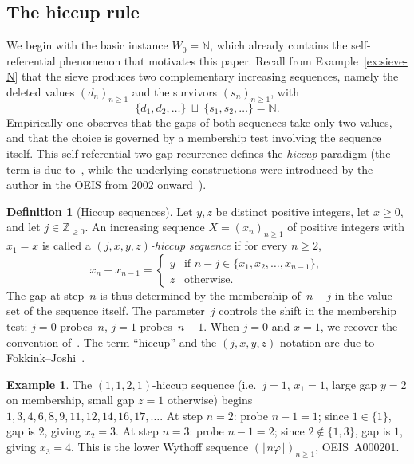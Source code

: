 \documentclass[11pt]{article}
\numberwithin{equation}{section}
\theoremstyle{plain}
\theoremstyle{definition}
\newtheorem{definition}[theorem]{Definition}
\newtheorem{example}[theorem]{Example}
\theoremstyle{remark}
\newcommand{\N}{\mathbb{N}}
\newcommand{\Z}{\mathbb{Z}}
\begin{document}
\subsection{The hiccup rule}\label{sec:hiccup}

We begin with the basic instance $W_0=\N$, which already contains the
self-referential phenomenon that motivates this paper. Recall from
Example~\ref{ex:sieve-N} that the sieve produces two complementary
increasing sequences, namely the deleted values $(d_n)_{n\ge1}$ and the
survivors $(s_n)_{n\ge1}$, with
\[
\{d_1,d_2,\ldots\}\ \sqcup\ \{s_1,s_2,\ldots\}=\N.
\]
Empirically one observes that the gaps of both sequences take only two
values, and that the choice is governed by a membership test involving
the sequence itself.  This self-referential two-gap recurrence defines
the \emph{hiccup} paradigm (the term is due to~\cite{FJ2026}, while the
underlying constructions were introduced by the author in the OEIS from 2002 onward~\cite{OEIS}).

\begin{definition}[Hiccup sequences]\label{def:hiccup}
Let $y,z$ be distinct positive integers, let $x\ge0$, and let
$j\in\Z_{\ge0}$.
An increasing sequence $X=(x_n)_{n\ge1}$ of positive integers
with $x_1=x$ is called a \emph{$(j,x,y,z)$-hiccup sequence}
if for every $n\ge2$,
\begin{equation}\label{eq:hiccup-def}
  x_n-x_{n-1}=
  \begin{cases}
    y & \text{if } n-j\in\{x_1,x_2,\ldots,x_{n-1}\},\\
    z & \text{otherwise.}
  \end{cases}
\end{equation}
The gap at step~$n$ is thus determined by the membership of~$n-j$
in the value set of the sequence itself.
The parameter~$j$ controls the shift in the membership test:
$j=0$ probes~$n$, $j=1$ probes~$n-1$.
When $j=0$ and $x=1$, we recover the convention
of~\cite{Cloitre2025}.  The term ``hiccup'' and the
$(j,x,y,z)$-notation are due to Fokkink--Joshi~\cite{FJ2026}.
\end{definition}

\begin{example}\label{ex:hiccup-simple}
The $(1,1,2,1)$-hiccup sequence (i.e.\ $j=1$, $x_1=1$, large gap $y=2$ on
membership, small gap $z=1$ otherwise) begins
$1,3,4,6,8,9,11,12,14,16,17,\ldots$.
At step $n=2$: probe $n-1=1$; since $1\in\{1\}$, gap is $2$, giving $x_2=3$.
At step $n=3$: probe $n-1=2$; since $2\notin\{1,3\}$, gap is $1$, giving $x_3=4$.
This is the lower Wythoff sequence $(\lfloor n\varphi\rfloor)_{n\ge1}$, OEIS~A000201.
\end{example}
\end{document}
